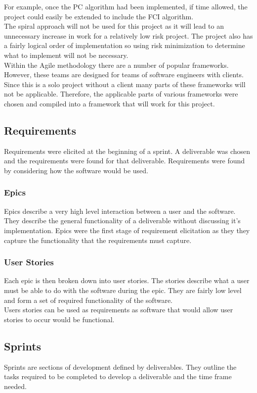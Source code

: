\documentclass{article}
\begin{document}
For example, once the PC algorithm had been implemented, if time allowed, the project could easily be extended to include the FCI algorithm.\\

The spiral approach will not be used for this project as it will lead to an unnecessary increase in work for a relatively low risk project. The project also has a fairly logical order of implementation so using risk minimization to determine what to implement will not be necessary.\\

Within the Agile methodology there are a number of popular frameworks. However, these teams are designed for teams of software engineers with clients. Since this is a solo project without a client many parts of these frameworks will not be applicable. Therefore, the applicable parts of various frameworks were chosen and compiled into a framework that will work for this project.


\subsection{Requirements}
Requirements were elicited at the beginning of a sprint. A deliverable was chosen and the requirements were found for that deliverable. Requirements were found by considering how the software would be used.

\subsubsection{Epics}
Epics describe a very high level interaction between a user and the software. They describe the general functionality of a deliverable without discussing it's implementation. Epics were the first stage of requirement elicitation as they they capture the functionality that the requirements must capture.
\subsubsection{User Stories}
Each epic is then broken down into user stories. The stories describe what a user must be able to do with the software during the epic. They are fairly low level and form a set of required functionality of the software.\\

Users stories can be used as requirements as software that would allow user stories to occur would be functional.

\subsection{Sprints}
Sprints are sections of development defined by deliverables. They outline the tasks required to be completed to develop a deliverable and the time frame needed.\\
\end{document}
